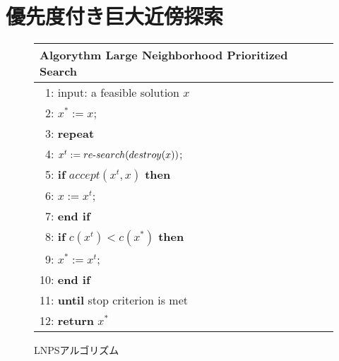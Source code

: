 \section{優先度付き巨大近傍探索}
\begin{figure}[tb]\centering
\begin{tabular}{l}\hline
\textbf{Algorythm} Large Neighborhood Prioritized Search\\\hline
 ~1: input: a feasible solution $x$ \\
 ~2: $x^{*} :=  x$; \\
 ~3: \bf{repeat} \\
 ~4: \quad \quad $x^{t} := re\mathchar`-search(destroy(x))$; \\
 ~5: \quad \quad \textbf{if} $accept(x^{t}, x)$ \textbf{then} \\
 ~6: \quad \quad \quad \quad $x := x^{t}$; \\
 ~7: \quad \quad \textbf{end if} \\
 ~8: \quad \quad \textbf{if} $c(x^{t}) < c(x^{*})$ \textbf{then} \\
 ~9: \quad \quad \quad \quad $x^{*} := x^{t}$; \\
10: \quad \quad \textbf{end if} \\
11: \textbf{until} stop criterion is met \\
12: \textbf{return} $x^{*}$ \\ \hline
\end{tabular}
\caption{LNPSアルゴリズム}
\label{algo:lnps}
\end{figure}


